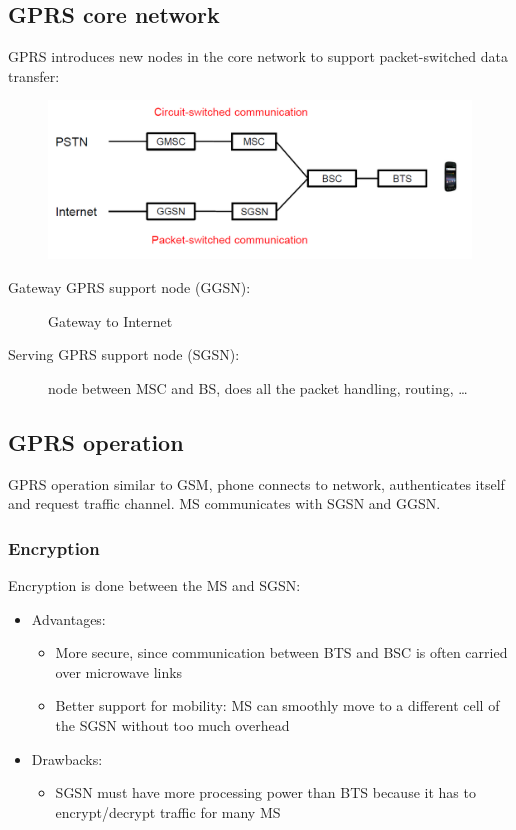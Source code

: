 \subsection{GPRS core network}
GPRS introduces new nodes in the core network to support 
packet-switched data transfer:
\begin{figure}
	\centering
	\includegraphics[scale=0.5]{img/gprs.png}
\end{figure}
\begin{description}
	\item[Gateway GPRS support node (GGSN):] Gateway to Internet
	\item[Serving GPRS support node (SGSN):] node between MSC and
	BS, does all the packet handling, routing, \ldots
\end{description}

\subsection{GPRS operation}
GPRS operation similar to GSM, phone connects to network, authenticates itself 
and request traffic channel. MS communicates with SGSN and GGSN.

 \subsubsection{Encryption}
 Encryption is done between the MS and SGSN:
 \begin{itemize}
	\item Advantages:
	\begin{itemize}
		\item More secure, since communication between BTS and BSC is often carried 
		over microwave links
		\item Better support for mobility: MS can smoothly move to a different cell 
		of the SGSN without too much overhead
	\end{itemize}
	\item Drawbacks:
	\begin{itemize}
		\item SGSN must have more processing power than BTS because it has 
		to encrypt/decrypt traffic for many MS
	\end{itemize}
\end{itemize}

